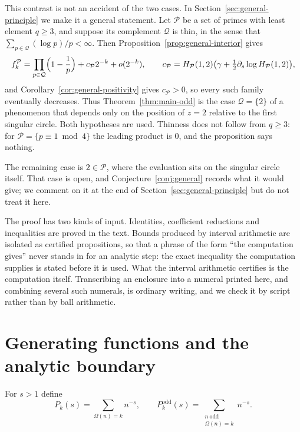 \documentclass[11pt]{amsart}
\theoremstyle{plain}
\theoremstyle{definition}
\begin{document}
This contrast is not an accident of the two cases. In
Section~\ref{sec:general-principle} we make it a general statement. Let
$\mathcal P$ be a set of primes with least element $q\geq3$, and suppose its
complement $\mathcal Q$ is thin, in the sense that
$\sum_{p\in\mathcal Q}(\log p)/p<\infty$. Then
Proposition~\ref{prop:general-interior} gives
\[
  f_k^{\mathcal P}
   =\prod_{p\in\mathcal Q}\Bigl(1-\frac1p\Bigr)+c_{\mathcal P}2^{-k}+o(2^{-k}),
  \qquad
  c_{\mathcal P}=H_{\mathcal P}(1,2)
   \bigl(\gamma+\tfrac12\partial_s\log H_{\mathcal P}(1,2)\bigr),
\]
and Corollary~\ref{cor:general-positivity} gives $c_{\mathcal P}>0$, so every
such family eventually decreases. Thus Theorem~\ref{thm:main-odd} is the case
$\mathcal Q=\{2\}$ of a phenomenon that depends only on the position of $z=2$
relative to the first singular circle. Both hypotheses are used. Thinness does
not follow from $q\geq3$: for $\mathcal P=\{p\equiv1\bmod4\}$ the leading
product is $0$, and the proposition says nothing.

The remaining case is $2\in\mathcal P$, where the evaluation sits on the
singular circle itself. That case is open, and
Conjecture~\ref{conj:general} records what it would give; we comment on it at
the end of Section~\ref{sec:general-principle} but do not treat it here.

The proof has two kinds of input. Identities, coefficient reductions and
inequalities are proved in the text. Bounds produced by interval arithmetic
are isolated as certified propositions, so that a phrase of the form ``the
computation gives'' never stands in for an analytic step: the exact inequality
the computation supplies is stated before it is used. What the interval
arithmetic certifies is the computation itself. Transcribing an enclosure into
a numeral printed here, and combining several such numerals, is ordinary
writing, and we check it by script rather than by ball arithmetic.

\section{Generating functions and the analytic boundary}

For $s>1$ define
\[
  P_k(s)=\sum_{\Omega(n)=k}n^{-s},
  \qquad
  P_k^{\mathrm{odd}}(s)=
  \sum_{\substack{n\ \mathrm{odd}\\\Omega(n)=k}}n^{-s}.
\]
\end{document}
